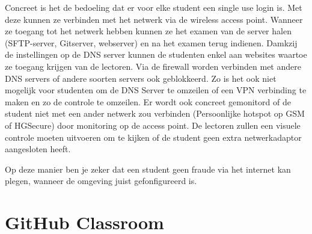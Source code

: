 Concreet is het de bedoeling dat er voor elke student een single use login is. Met deze kunnen ze verbinden met het netwerk via de wireless access point. Wanneer ze toegang tot het netwerk hebben kunnen ze het examen van de server halen (SFTP-server, Gitserver, webserver) en na het examen terug indienen. Damkzij de instellingen op de DNS server kunnen de studenten enkel aan websites waartoe ze toegang krijgen van de lectoren. Via de firewall worden verbinden met andere DNS servers of andere soorten servers ook geblokkeerd. Zo is het ook niet mogelijk voor studenten om de DNS Server te omzeilen of een VPN verbinding te maken en zo de controle te omzeilen. Er wordt ook concreet gemonitord of de student niet met een ander netwerk zou verbinden (Persoonlijke hotspot op GSM of HGSecure) door monitoring op de access point. De lectoren zullen een visuele controle moeten uitvoeren om te kijken of de student geen extra netwerkadaptor aangesloten heeft. 

Op deze manier ben je zeker dat een student geen fraude via het internet kan plegen, wanneer de omgeving juist gefonfigureerd is.


\section{GitHub Classroom}
\label{sec:GHC}



